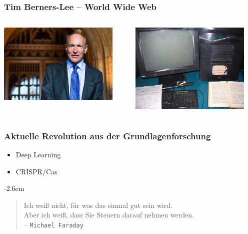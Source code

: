 \documentclass[14pt]{beamer}
\begin{document}
\begin{frame}
	\frametitle{Tim Berners-Lee -- World Wide Web}
	\begin{center}
		\begin{columns}
			\begin{column}{0.5\textwidth}
		\includegraphics[width=0.9\textwidth]{tim_berners_lee.jpg}
			\end{column}
			\begin{column}{0.5\textwidth}
		\includegraphics[width=0.9\textwidth]{tim_berners_lee_setup.jpg}
			\end{column}
		\end{columns}
	\end{center}
\end{frame}

\begin{frame}
	\frametitle{Aktuelle Revolution aus der Grundlagenforschung}
	\begin{center}
		\begin{itemize}
			\item Deep Learning
			\item CRISPR/Cas
		\end{itemize}
	\end{center}
\end{frame}

\begin{frame}
	
	\vspace{2em}
	\begingroup
	\advance\leftmargini -2.6em
	\begin{quote}
		Ich weiß nicht, für was das einmal gut sein wird.\\ Aber ich weiß, dass Sie Steuern darauf nehmen werden.\\ -- \texttt{Michael Faraday}
	\end{quote}
	\endgroup
\end{frame}
	
\end{document}
